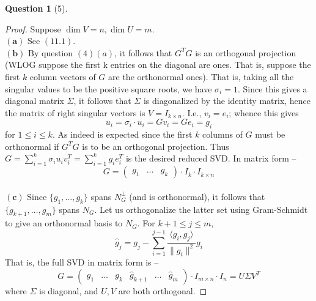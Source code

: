 \documentclass[11pt]{article}
\theoremstyle{quest}
\newtheorem*{question}{Question}
\begin{document}
\begin{question}[5]
\end{question}
\begin{proof}
Suppose $\dim V = n, \dim U = m$.
\\$\mathbf{(a)}$ See $(11.1)$.
\\$\mathbf{(b)}$ By question $(4)(a)$, it follows that $G^TG$ is an orthogonal projection (WLOG suppose the first k entries on the diagonal are ones. That is, suppose the first $k$ column vectors of $G$ are the orthonormal ones). That is, taking all the singular values to be the positive square roots, we have $\sigma_i  = 1$. Since this gives a diagonal matrix $\Sigma$, it follows that $\Sigma$ is diagonalized by the identity matrix, hence the matrix of right singular vectors is $V = I_{k \times n}$. I.e., $v_i = e_i$; whence this gives
$$u_i = \sigma_i \cdot u_i = G v_i = G e_i = g_i$$
for $1 \le i \le k$. As indeed is expected since the first $k$ columns of $G$ must be orthonormal if $G^TG$ is to be an orthogonal projection. Thus $G = \sum_{i=1}^k \sigma_i u_i v_i^T = \sum_{i=1}^k g_i e_i^T$ is the desired reduced SVD. In matrix form --
$$G = \begin{pmatrix}
g_1 & \ldots & g_k
\end{pmatrix} \cdot I_k \cdot I_{k \times n}$$
\\$\mathbf{(c)}$ Since $\{g_1, \ldots, g_k\}$ spans $N_G^{\perp}$ (and is orthonormal), it follows that $\{g_{k+1}, \ldots, g_m\}$ spans $N_G$. Let us orthogonalize the latter set using Gram-Schmidt to give an orthonormal basis to $N_G$. For $k+1 \le j \le m$,
$$\hat{g}_j = g_j - \sum_{i=1}^{j-1}\dfrac{\langle g_i, g_j \rangle}{\|g_i\|^2}g_i$$
That is, the full SVD in matrix form is --
$$G = \begin{pmatrix}
g_1 & \ldots & g_k & \hat{g}_{k+1} & \ldots & \hat{g}_m
\end{pmatrix} \cdot I_{m \times n} \cdot I_n = U \Sigma V^T$$
where $\Sigma$ is diagonal, and $U, V$ are both orthogonal.
\end{proof}
\end{document}
